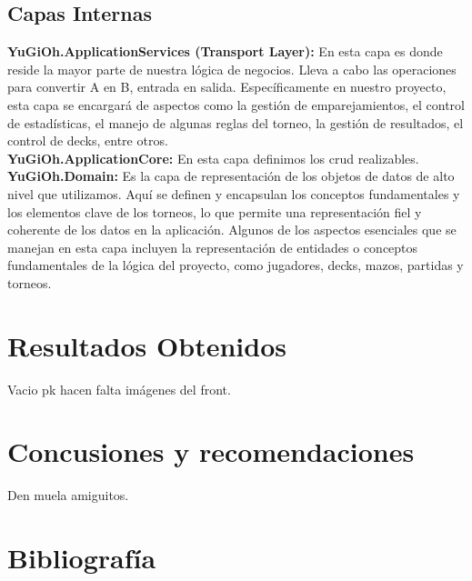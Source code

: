 \documentclass[a4paper]{article}
\begin{document}
\subsection{Capas Internas}
\textbf{YuGiOh.ApplicationServices (Transport Layer):} En esta capa es donde reside la mayor parte de nuestra lógica
de negocios. Lleva a cabo las operaciones para convertir A en B, entrada en salida.
Específicamente en nuestro proyecto, esta capa se encargará de aspectos como la
gestión de emparejamientos, el control de estadísticas, el manejo de algunas reglas
del torneo, la gestión de resultados, el control de decks, entre otros.\\
\textbf{YuGiOh.ApplicationCore:} En esta capa definimos los crud realizables.
\textbf{YuGiOh.Domain:} Es la capa de representación de los objetos de datos de alto nivel
que utilizamos. Aquí se definen y encapsulan los conceptos fundamentales y los
elementos clave de los torneos, lo que permite una representación fiel y coherente de los
datos en la aplicación. Algunos de los aspectos esenciales que se manejan en esta
capa incluyen la representación de entidades o conceptos fundamentales de la
lógica del proyecto, como jugadores, decks, mazos, partidas y torneos.
\newpage

\section{Resultados Obtenidos}
Vacio pk hacen falta im\'agenes del front.

\newpage

\section{Concusiones y recomendaciones}
Den muela amiguitos.

\newpage

\section{Bibliograf\'ia}
\end{document}

